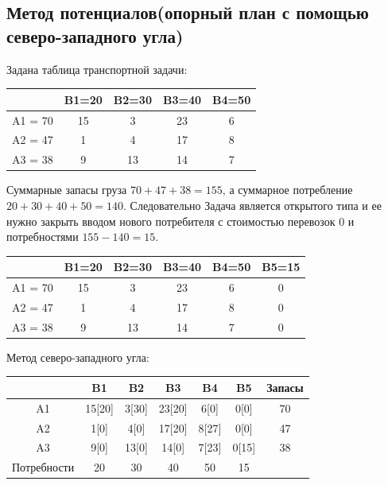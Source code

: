 \documentclass[a4paper, 12pt]{article}
\begin{document}
\newpage
\subsection{Метод потенциалов(опорный план с помощью северо-западного угла)}

Задана таблица транспортной задачи:
\begin{table}[H]
\centering
\begin{tabular}{c|c|c|c|c|}
\cline{2-5}
                              & B1=20 & B2=30 & B3=40 & B4=50 \\ \hline
\multicolumn{1}{|c|}{A1 = 70} & 15    & 3     & 23    & 6     \\ \hline
\multicolumn{1}{|c|}{A2 = 47} & 1     & 4     & 17    & 8     \\ \hline
\multicolumn{1}{|c|}{A3 = 38} & 9     & 13    & 14    & 7     \\ \hline
\end{tabular}
\end{table}

Суммарные запасы груза $70+47+38=155$, а суммарное потребление $20+30+40+50=140$. Следовательно Задача является открытого типа и ее нужно закрыть вводом нового потребителя с стоимостью перевозок 0 и потребностями $155-140=15$.
\begin{table}[H]
\centering
\begin{tabular}{c|c|c|c|c|c|}
\cline{2-6}
                              & B1=20 & B2=30 & B3=40 & B4=50 & B5=15 \\ \hline
\multicolumn{1}{|c|}{A1 = 70} & 15    & 3     & 23    & 6     & 0     \\ \hline
\multicolumn{1}{|c|}{A2 = 47} & 1     & 4     & 17    & 8     & 0     \\ \hline
\multicolumn{1}{|c|}{A3 = 38} & 9     & 13    & 14    & 7     & 0     \\ \hline
\end{tabular}
\end{table}

Метод северо-западного угла:
\begin{table}[H]
\centering
\begin{tabular}{|c|c|c|c|c|c|c|}
\hline
            & B1      & B2    & B3    & B4    & B5    & Запасы \\ \hline
A1          & 15[20]  & 3[30] & 23[20]& 6[0]  & 0[0]  & 70     \\ \hline
A2          & 1[0]    & 4[0]  & 17[20]& 8[27] & 0[0]  & 47     \\ \hline
A3          & 9[0]    & 13[0] & 14[0] & 7[23] & 0[15] & 38     \\ \hline
Потребности & 20      & 30    & 40    & 50    & 15    &        \\ \hline
\end{tabular}
\end{table}
\end{document}
